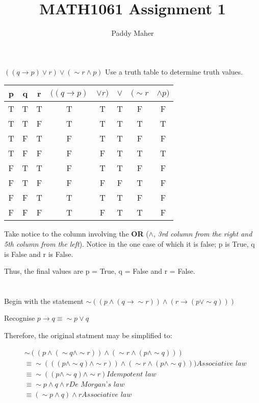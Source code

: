 \documentclass{article}
\title{MATH1061 Assignment 1}
\author{Paddy Maher}
\begin{document}
\maketitle

\section{}
$(( q \rightarrow p ) \lor r ) \lor ( \sim r \wedge p )$
Use a truth table to determine truth values.

\begin{tabular} { c|c|c|c c c c c }
p & q & r & $(( q \rightarrow p )$ &  $\lor r )$&  $\lor$ &$( \sim r$& $\wedge p )$ \\
\hline
T & T & T & T & T & T & F & F \\
T & T & F & T & T & T & T & T \\
T & F & T & F & T & T & F & F \\
T & F & F & F & F & T & T & T \\
F & T & T & F & T & T & F & F \\
F & T & F & F & F & F & T & F \\
F & F & T & T & T & T & F & F \\
F & F & F & T & F & T & T & F \\
\end{tabular}

Take notice to the column involving the \textbf{OR} ($\wedge$, \textit{3rd column from the right
and 5th column from the left}). Notice in the one case of which it is false; p is True, q is False and r is False.

Thus, the final values are p = True, q = False and r = False.

\section{}

Begin with the statement $\sim (( p \wedge ( q \rightarrow \sim r )) \wedge ( r \rightarrow ( p \lor \sim q )))$

Recognise $p \rightarrow q \equiv \sim p \lor q$

Therefore, the original statment may be simplified to:

\begin{align*}
& \sim (( p \wedge ( \sim q \wedge \sim r )) \wedge (  \sim r \wedge ( p \wedge \sim q ))) \\
& \equiv \sim ((( p \wedge \sim q ) \wedge \sim r )) \wedge (  \sim r \wedge ( p \wedge \sim q )))    \textit{Associative law} \\
& \equiv \sim (( p \wedge \sim q ) \wedge \sim r )    \textit{Idempotent law}  \\
& \equiv \sim p \wedge q \wedge r    \textit{De Morgan's law} \\
& \equiv ( \sim p \wedge q ) \wedge r    \textit{Associative law}
\end{align*}
\end{document}
